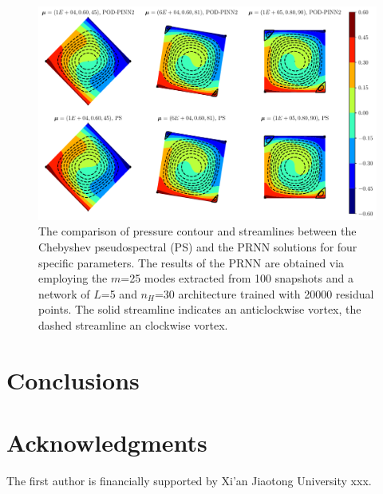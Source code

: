 \documentclass[preprint, 10pt]{elsarticle}
\begin{document}
\begin{figure}[!ht]
  \centering
  \includegraphics[width=16cm]{../../pythonNN/2DNaturalConvection/fig/ResultComparsion.pdf}
\caption{The comparison of pressure contour and streamlines between the Chebyshev pseudospectral (PS) and the PRNN solutions for four specific parameters. The results of the PRNN are obtained via employing the $m$=25 modes extracted from 100 snapshots and a network of $L$=5 and $n_H$=30 architecture trained with 20000 residual points. The solid streamline indicates an anticlockwise vortex, the dashed streamline an clockwise vortex.}
\label{fig_2DNaturalConvectionResultComparsion}
\end{figure}



\section{Conclusions}





\section*{Acknowledgments}
The first author is financially supported by Xi'an Jiaotong University xxx.



\end{document}
